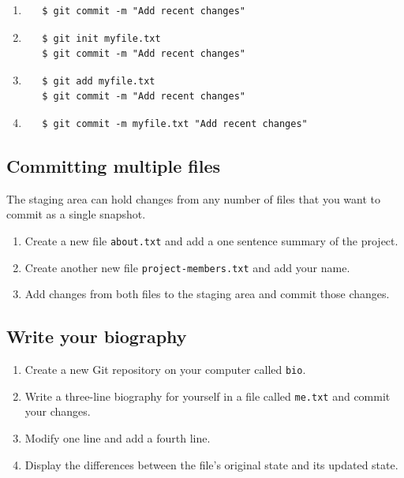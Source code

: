 \documentclass[
]{krantz}
\providecommand{\tightlist}{%
  \setlength{\itemsep}{0pt}\setlength{\parskip}{0pt}}
\begin{document}
\begin{enumerate}
\def\labelenumi{\arabic{enumi}.}
\item
\begin{verbatim}
   $ git commit -m "Add recent changes"
\end{verbatim}
\item
\begin{verbatim}
   $ git init myfile.txt
   $ git commit -m "Add recent changes"
\end{verbatim}
\item
\begin{verbatim}
   $ git add myfile.txt
   $ git commit -m "Add recent changes"
\end{verbatim}
\item
\begin{verbatim}
   $ git commit -m myfile.txt "Add recent changes"
\end{verbatim}
\end{enumerate}

\hypertarget{git-cmdline-ex-multiple}{%
\subsection{Committing multiple files}\label{git-cmdline-ex-multiple}}

The staging area can hold changes from any number of files
that you want to commit as a single snapshot.

\begin{enumerate}
\def\labelenumi{\arabic{enumi}.}
\item
  Create a new file \texttt{about.txt} and add a one sentence summary of the project.
\item
  Create another new file \texttt{project-members.txt}
  and add your name.
\item
  Add changes from both files to the staging area
  and commit those changes.
\end{enumerate}

\hypertarget{git-cmdline-ex-bio}{%
\subsection{Write your biography}\label{git-cmdline-ex-bio}}

\begin{enumerate}
\def\labelenumi{\arabic{enumi}.}
\tightlist
\item
  Create a new Git repository on your computer called \texttt{bio}.
\item
  Write a three-line biography for yourself in a file called \texttt{me.txt} and commit your changes.
\item
  Modify one line and add a fourth line.
\item
  Display the differences between the file's original state and its updated state.
\end{enumerate}
\end{document}
